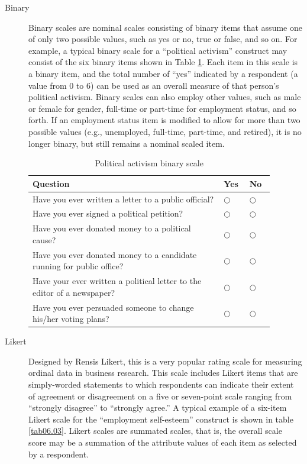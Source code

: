 \begin{description}
	\item[Binary] Binary scales are nominal scales consisting of binary items that assume one of only two possible values, such as yes or no, true or false, and so on. For example, a typical binary scale for a ``political activism'' construct may consist of the six binary items shown in Table \ref{tab06.02}. Each item in this scale is a binary item, and the total number of ``yes'' indicated by a respondent (a value from $ 0 $ to $ 6 $) can be used as an overall measure of that person's political activism. Binary scales can also employ other values, such as male or female for gender, full-time or part-time for employment status, and so forth. If an employment status item is modified to allow for more than two possible values (e.g., unemployed, full-time, part-time, and retired), it is no longer binary, but still remains a nominal scaled item.
	
	\begin{table}[H]
		\centering
		\begin{tabularx}{0.95\linewidth}{p{0.70\linewidth}p{0.09\linewidth}p{0.09\linewidth}}
			\toprule
			\textbf{Question} & \textbf{Yes} & \textbf{No} \\
			\midrule
			Have you ever written a letter to a public official? & $ \bigcirc $ & $ \bigcirc $ \\ 
			Have you ever signed a political petition? & $ \bigcirc $ & $ \bigcirc $ \\ 
			Have you ever donated money to a political cause? & $ \bigcirc $ & $ \bigcirc $ \\ 
			Have you ever donated money to a candidate running for public office? & $ \bigcirc $ & $ \bigcirc $ \\ 
			Have your ever written a political letter to the editor of a newspaper?& $ \bigcirc $ & $ \bigcirc $ \\ 
			Have you ever persuaded someone to change his/her voting plans? & $ \bigcirc $ & $ \bigcirc $ \\ 
			\bottomrule
		\end{tabularx}
		\caption{Political activism binary scale}
		\label{tab06.02}
	\end{table}
	
	\item[Likert] Designed by Rensis Likert, this is a very popular rating scale for measuring ordinal data in business research. This scale includes Likert items that are simply-worded statements to which respondents can indicate their extent of agreement or disagreement on a five or seven-point scale ranging from ``strongly disagree'' to ``strongly agree.'' A typical example of a six-item Likert scale for the ``employment self-esteem'' construct is shown in table \ref{tab06.03}. Likert scales are summated scales, that is, the overall scale score may be a summation of the attribute values of each item as selected by a respondent.
	

\end{description}
